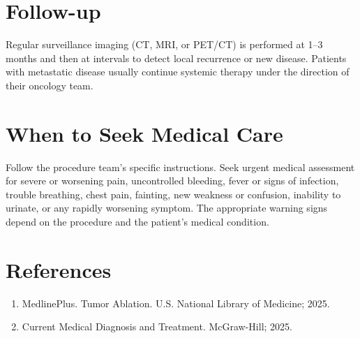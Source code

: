 \section*{Follow-up}
Regular surveillance imaging (CT, MRI, or PET/CT) is performed at 1--3 months and then at intervals to detect local recurrence or new disease. Patients with metastatic disease usually continue systemic therapy under the direction of their oncology team.

\section*{When to Seek Medical Care}
Follow the procedure team's specific instructions. Seek urgent medical assessment for severe or worsening pain, uncontrolled bleeding, fever or signs of infection, trouble breathing, chest pain, fainting, new weakness or confusion, inability to urinate, or any rapidly worsening symptom. The appropriate warning signs depend on the procedure and the patient's medical condition.

\section*{References}
\begin{enumerate}
  \item MedlinePlus. Tumor Ablation. U.S. National Library of Medicine; 2025.
  \item Current Medical Diagnosis and Treatment. McGraw-Hill; 2025.
\end{enumerate}

\clearpage

